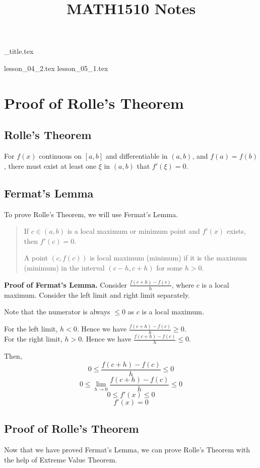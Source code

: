 \documentclass{article}
\title{MATH1510 Notes}
\author{}
\date{}
\begin{document}
{_title.tex}

{lesson_04_2.tex}
{lesson_05_1.tex}

\section{Proof of Rolle's Theorem}

\subsection{Rolle's Theorem}

For $f(x)$ continuous on $[a, b]$ and differentiable in $(a, b)$, and $f(a) = f(b)$, there must exist at least one $\xi$ in $(a, b)$ that $f'(\xi) = 0$.

\subsection{Fermat's Lemma}

To prove Rolle's Theorem, we will use Fermat's Lemma.

\begin{quote}
    If $c \in (a, b)$ is a local maximum or minimum point and $f'(x)$ exists, then $f'(c) = 0$.
    
    A point $(c, f(c))$ is local maximum (minimum) if it is the maximum (minimum) in the interval $(c - h, c + h)$ for some $h > 0$.
\end{quote}

\textbf{Proof of Fermat's Lemma.}
Consider $\frac{f(c + h) - f(c)}{h}$, where $c$ is a local maximum. Consider the left limit and right limit separately.

Note that the numerator is always $\leq 0$ as $c$ is a local maximum.

For the left limit, $h < 0$. Hence we have $\frac{f(c + h) - f(c)}{h} \geq 0$.\\
For the right limit, $h > 0$. Hence we have $\frac{f(c + h) - f(c)}{h} \leq 0$.

Then, $$ 0 \leq \frac{f(c + h) - f(c)}{h} \leq 0 $$
$$ 0 \leq \lim_{h \to 0} \frac{f(c + h) - f(c)}{h} \leq 0 $$
$$ 0 \leq f'(x) \leq 0 $$
$$ f'(x) = 0 $$

\subsection{Proof of Rolle's Theorem}

Now that we have proved Fermat's Lemma, we can prove Rolle's Theorem with the help of Extreme Value Theorem.
\end{document}
